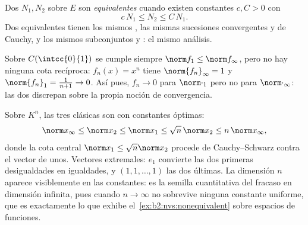 \begin{definition}\label{def:b2:nvs:equivalent}
Dos  $N_1, N_2$ sobre $E$ son
\emph{equivalentes} cuando existen
constantes $c, C > 0$ con
\[
c\,N_1 \leq N_2 \leq C\, N_1 .
\]
Dos  equivalentes tienen los mismos , las mismas
sucesiones convergentes y de Cauchy, y los mismos subconjuntos
 y : el mismo análisis.
\end{definition}

\begin{example}\label{ex:b2:nvs:nonequivalent}
Sobre $C(\intcc{0}{1})$ se cumple siempre $\norm f_1 \leq \norm
f_\infty$, pero no hay ninguna cota recíproca: $f_n(x) = x^n$ tiene
$\norm{f_n}_\infty = 1$ y $\norm{f_n}_1 = \frac{1}{n+1} \to 0$. Así
pues, $f_n \to 0$ para $\norm\cdot_1$ pero no para
$\norm\cdot_\infty$: las dos  discrepan sobre la propia noción
de convergencia.
\end{example}

\begin{example}\label{ex:b2:nvs:constants}
Sobre $K^n$, las tres  clásicas son  con
constantes óptimas:
\[
\norm x_\infty \leq \norm x_2 \leq \norm x_1
\leq \sqrt n\,\norm x_2 \leq n\,\norm x_\infty ,
\]
donde la cota central $\norm x_1 \leq \sqrt n\norm x_2$ procede de
Cauchy--Schwarz contra el vector de unos. Vectores extremales:
$e_1$ convierte las dos primeras desigualdades en igualdades, y
$(1, 1, \dots, 1)$ las dos últimas. La dimensión $n$ aparece
visiblemente en las constantes: es la semilla cuantitativa del
fracaso en dimensión infinita, pues cuando $n \to \infty$ no
sobrevive ninguna constante uniforme, que es exactamente lo que
exhibe el~\cref{ex:b2:nvs:nonequivalent} sobre espacios de
funciones.
\end{example}

